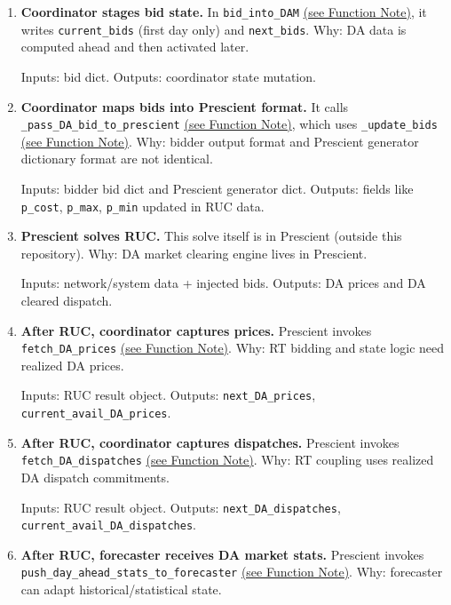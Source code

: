 \documentclass{article}
\begin{document}
\begin{enumerate}[leftmargin=*]
  Inputs: date/hour, forecaster scenarios via \texttt{forecast\_day\_ahead\_and\_real\_time\_prices} \hyperref[fn:forecast_day_ahead_and_real_time_prices]{(see Function Note)}. Outputs: per-time bid dictionary.

  \item \textbf{Coordinator stages bid state.} In \texttt{bid\_into\_DAM} \hyperref[fn:bid_into_DAM]{(see Function Note)}, it writes \texttt{current\_bids} (first day only) and \texttt{next\_bids}. Why: DA data is computed ahead and then activated later.

  Inputs: bid dict. Outputs: coordinator state mutation.

  \item \textbf{Coordinator maps bids into Prescient format.} It calls \texttt{\_pass\_DA\_bid\_to\_prescient} \hyperref[fn:pass_DA_bid_to_prescient]{(see Function Note)}, which uses \texttt{\_update\_bids} \hyperref[fn:update_bids]{(see Function Note)}. Why: bidder output format and Prescient generator dictionary format are not identical.

  Inputs: bidder bid dict and Prescient generator dict. Outputs: fields like \texttt{p\_cost}, \texttt{p\_max}, \texttt{p\_min} updated in RUC data.

  \item \textbf{Prescient solves RUC.} This solve itself is in Prescient (outside this repository). Why: DA market clearing engine lives in Prescient.

  Inputs: network/system data + injected bids. Outputs: DA prices and DA cleared dispatch.

  \item \textbf{After RUC, coordinator captures prices.} Prescient invokes \texttt{fetch\_DA\_prices} \hyperref[fn:fetch_DA_prices]{(see Function Note)}. Why: RT bidding and state logic need realized DA prices.

  Inputs: RUC result object. Outputs: \texttt{next\_DA\_prices}, \texttt{current\_avail\_DA\_prices}.

  \item \textbf{After RUC, coordinator captures dispatches.} Prescient invokes \texttt{fetch\_DA\_dispatches} \hyperref[fn:fetch_DA_dispatches]{(see Function Note)}. Why: RT coupling uses realized DA dispatch commitments.

  Inputs: RUC result object. Outputs: \texttt{next\_DA\_dispatches}, \texttt{current\_avail\_DA\_dispatches}.

  \item \textbf{After RUC, forecaster receives DA market stats.} Prescient invokes \texttt{push\_day\_ahead\_stats\_to\_forecaster} \hyperref[fn:push_day_ahead_stats_to_forecaster]{(see Function Note)}. Why: forecaster can adapt historical/statistical state.


\end{enumerate}
\end{document}
